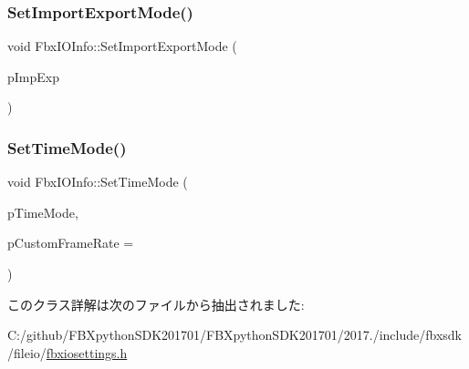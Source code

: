 \mbox{\label{class_fbx_i_o_info_a9043330ba9959715f579ff2a614f33c5}} 
\subsubsection{\texorpdfstring{Set\+Import\+Export\+Mode()}{SetImportExportMode()}}
{\footnotesize\ttfamily void Fbx\+I\+O\+Info\+::\+Set\+Import\+Export\+Mode (\begin{DoxyParamCaption}\item[{\hyperlink{class_fbx_i_o_info_a0c167beca637e7a1f723942694d61c75}{E\+Imp\+Exp}}]{p\+Imp\+Exp }\end{DoxyParamCaption})}

\mbox{\label{class_fbx_i_o_info_a6d1d7eda11ddc3d6df891ef2b3039246}} 
\subsubsection{\texorpdfstring{Set\+Time\+Mode()}{SetTimeMode()}}
{\footnotesize\ttfamily void Fbx\+I\+O\+Info\+::\+Set\+Time\+Mode (\begin{DoxyParamCaption}\item[{\hyperlink{class_fbx_time_acc529b00a0e8d4c3da3702449ca93031}{Fbx\+Time\+::\+E\+Mode}}]{p\+Time\+Mode,  }\item[{double}]{p\+Custom\+Frame\+Rate = {} }\end{DoxyParamCaption})}



このクラス詳解は次のファイルから抽出されました\+:\begin{DoxyCompactItemize}
\item 
C\+:/github/\+F\+B\+Xpython\+S\+D\+K201701/\+F\+B\+Xpython\+S\+D\+K201701/2017./include/fbxsdk/fileio/\hyperlink{fbxiosettings_8h}{fbxiosettings.\+h}\end{DoxyCompactItemize}
